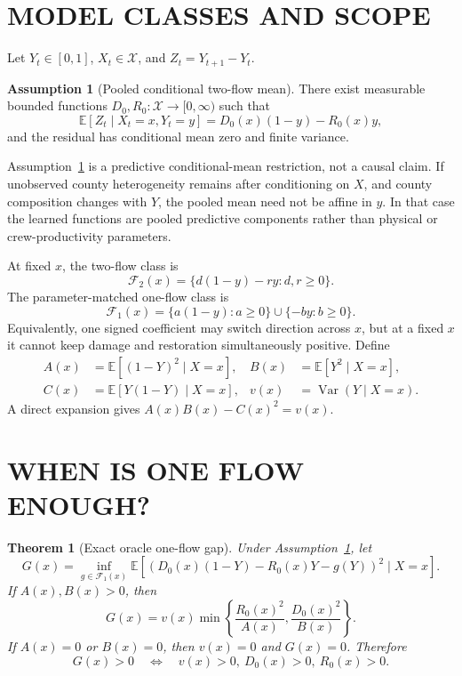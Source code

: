 \documentclass[twoside]{article}
\newcommand{\E}{\mathbb{E}}
\newcommand{\Var}{\operatorname{Var}}
\newcommand{\cF}{\mathcal{F}}
\newcommand{\cX}{\mathcal{X}}
\theoremstyle{plain}
\newtheorem{theorem}{Theorem}
\theoremstyle{definition}
\newtheorem{assumption}{Assumption}
\theoremstyle{remark}
\begin{document}
\section{MODEL CLASSES AND SCOPE}

Let \(Y_t\in[0,1]\), \(X_t\in\cX\), and \(Z_t=Y_{t+1}-Y_t\).

\begin{assumption}[Pooled conditional two-flow mean]
\label{ass:mean}
There exist measurable bounded functions \(D_0,R_0:\cX\to[0,\infty)\) such
that
\begin{equation}
\E[Z_t\mid X_t=x,Y_t=y]
=D_0(x)(1-y)-R_0(x)y,
\label{eq:drift}
\end{equation}
and the residual has conditional mean zero and finite variance.
\end{assumption}

Assumption~\ref{ass:mean} is a predictive conditional-mean restriction, not a
causal claim. If unobserved county heterogeneity remains after conditioning on
\(X\), and county composition changes with \(Y\), the pooled mean need not be
affine in \(y\). In that case the learned functions are pooled predictive
components rather than physical or crew-productivity parameters.

At fixed \(x\), the two-flow class is
\begin{equation}
\cF_2(x)=\{d(1-y)-ry:d,r\ge0\}.
\end{equation}
The parameter-matched one-flow class is
\begin{equation}
\cF_1(x)=\{a(1-y):a\ge0\}\cup\{-by:b\ge0\}.
\label{eq:oneclass}
\end{equation}
Equivalently, one signed coefficient may switch direction across \(x\), but at
a fixed \(x\) it cannot keep damage and restoration simultaneously positive.
Define
\begin{align}
A(x)&=\E[(1-Y)^2\mid X=x], & B(x)&=\E[Y^2\mid X=x],\nonumber\\
C(x)&=\E[Y(1-Y)\mid X=x], & v(x)&=\Var(Y\mid X=x).
\label{eq:moments}
\end{align}
A direct expansion gives \(A(x)B(x)-C(x)^2=v(x)\).

\section{WHEN IS ONE FLOW ENOUGH?}

\begin{theorem}[Exact oracle one-flow gap]
\label{thm:gap}
Under Assumption~\ref{ass:mean}, let
\[
G(x)=\inf_{g\in\cF_1(x)}
\E[(D_0(x)(1-Y)-R_0(x)Y-g(Y))^2\mid X=x].
\]
If \(A(x),B(x)>0\), then
\begin{equation}
\boxed{
G(x)=v(x)\min\!\left\{\frac{R_0(x)^2}{A(x)},
                        \frac{D_0(x)^2}{B(x)}\right\}.}
\label{eq:gap}
\end{equation}
If \(A(x)=0\) or \(B(x)=0\), then \(v(x)=0\) and \(G(x)=0\). Therefore
\begin{equation}
G(x)>0\quad\Longleftrightarrow\quad
v(x)>0,\ D_0(x)>0,\ R_0(x)>0.
\label{eq:gapstrict}
\end{equation}
\end{theorem}
\end{document}
